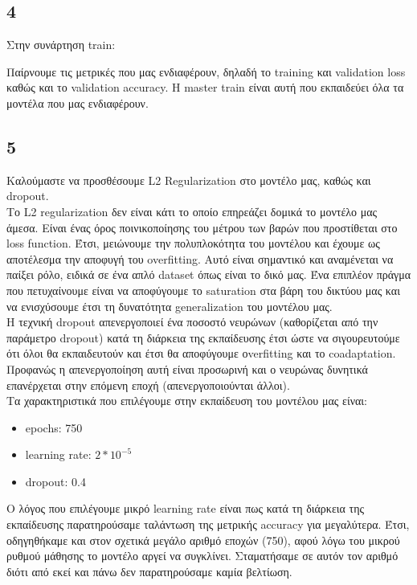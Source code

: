 \subsection*{4}

Στην συνάρτηση train:



\noindent Παίρνουμε τις μετρικές που μας ενδιαφέρουν, δηλαδή το training και validation loss καθώς και το validation accuracy. Η master train είναι αυτή που εκπαιδεύει όλα τα μοντέλα που μας ενδιαφέρουν.

\subsection*{5}
Καλούμαστε να προσθέσουμε L2 Regularization στο μοντέλο μας, καθώς και dropout. \\

\noindent Το L2 regularization δεν είναι κάτι το οποίο επηρεάζει δομικά το μοντέλο μας άμεσα. Είναι ένας όρος ποινικοποίησης του μέτρου των βαρών που προστίθεται στο loss function. Έτσι, μειώνουμε την πολυπλοκότητα του μοντέλου και έχουμε ως αποτέλεσμα την αποφυγή του overfitting. Αυτό είναι σημαντικό και αναμένεται να παίξει ρόλο, ειδικά σε ένα απλό dataset όπως είναι το δικό μας. Ένα επιπλέον πράγμα που πετυχαίνουμε είναι να αποφύγουμε το saturation στα βάρη του δικτύου μας και να ενισχύσουμε έτσι τη δυνατότητα generalization του μοντέλου μας. \\

\noindent Η τεχνική dropout απενεργοποιεί ένα ποσοστό νευρώνων (καθορίζεται από την παράμετρο dropout) κατά τη διάρκεια της εκπαίδευσης έτσι ώστε να σιγουρευτούμε ότι όλοι θα εκπαιδευτούν και έτσι θα αποφύγουμε οverfitting και το coadaptation. Προφανώς η απενεργοποίηση αυτή είναι προσωρινή και ο νευρώνας δυνητικά επανέρχεται στην επόμενη εποχή (απενεργοποιούνται άλλοι). \\

\noindent Τα χαρακτηριστικά που επιλέγουμε στην εκπαίδευση του μοντέλου μας είναι: 

\begin{itemize}
	\item epochs: 750
	\item learning rate: $2*10^{-5}$
	\item dropout: 0.4
\end{itemize}

\noindent Ο λόγος που  επιλέγουμε μικρό learning rate είναι πως κατά τη διάρκεια της εκπαίδευσης παρατηρούσαμε ταλάντωση της μετρικής accuracy για μεγαλύτερα. Έτσι, οδηγηθήκαμε και στον σχετικά μεγάλο αριθμό εποχών (750), αφού λόγω του μικρού ρυθμού μάθησης το μοντέλο αργεί να συγκλίνει. Σταματήσαμε σε αυτόν τον αριθμό διότι από εκεί και πάνω δεν παρατηρούσαμε καμία βελτίωση. 


